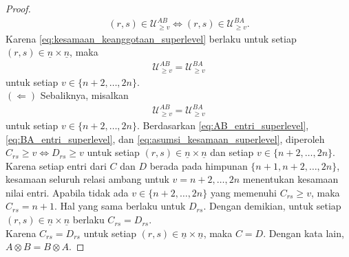 \begin{proof}
\begin{align}
    (r,s)\in\mathcal{U}_{\ge v}^{AB}
    \iff
    (r,s)\in\mathcal{U}_{\ge v}^{BA}.
  \end{align}
  Karena \eqref{eq:kesamaan_keanggotaan_superlevel} berlaku untuk setiap $(r,s)\in \underline{n}\times \underline{n}$, maka
  \begin{align}\label{eq:kesamaan_himpunan_superlevel}
    \mathcal{U}_{\ge v}^{AB}
    =
    \mathcal{U}_{\ge v}^{BA}
  \end{align}
  untuk setiap $v\in\{n+2,\ldots,2n\}$.\\
  \noindent$(\Leftarrow)$ Sebaliknya, misalkan
  \begin{align}\label{eq:asumsi_kesamaan_superlevel}
    \mathcal{U}_{\ge v}^{AB}
    =
    \mathcal{U}_{\ge v}^{BA}
  \end{align}
  untuk setiap $v\in\{n+2,\ldots,2n\}$. Berdasarkan \eqref{eq:AB_entri_superlevel}, \eqref{eq:BA_entri_superlevel}, dan \eqref{eq:asumsi_kesamaan_superlevel}, diperoleh $C_{rs}\ge v \iff D_{rs}\ge v$ untuk setiap $(r,s)\in \underline{n}\times \underline{n}$ dan setiap $v\in\{n+2,\ldots,2n\}$.\\
  Karena setiap entri dari $C$ dan $D$ berada pada himpunan $\{n+1,n+2,\ldots,2n\}$, kesamaan seluruh relasi ambang untuk $v=n+2,\ldots,2n$ menentukan kesamaan nilai entri. Apabila tidak ada $v\in\{n+2,\ldots,2n\}$ yang memenuhi $C_{rs}\ge v$, maka $C_{rs}=n+1$. Hal yang sama berlaku untuk $D_{rs}$. Dengan demikian, untuk setiap $(r,s)\in \underline{n}\times \underline{n}$ berlaku $C_{rs}=D_{rs}$.\\
  Karena $C_{rs}=D_{rs}$ untuk setiap $(r,s)\in \underline{n}\times \underline{n}$, maka $C=D$. Dengan kata lain, $A\otimes B=B\otimes A$.
\end{proof}

